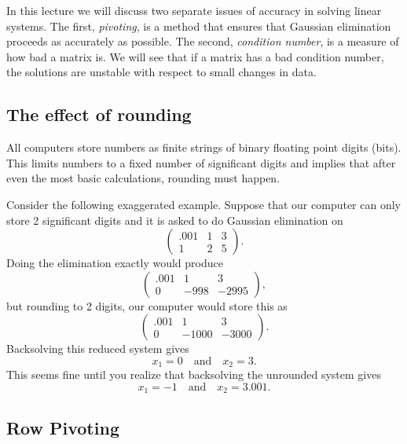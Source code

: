 In this lecture we will discuss two separate issues
of accuracy in solving linear systems. The first,
{\em pivoting}, is a method that ensures that Gaussian
elimination proceeds as accurately as possible.
The second, {\em condition number}, is a measure
of how bad a matrix is. We will see that if a matrix has
a bad condition number, the solutions are unstable with
respect to small changes in data.


\subsection*{The effect of rounding}

All computers store numbers as  finite strings of binary
floating point digits (bits). This limits numbers to a fixed
number of significant digits and implies that after even
the most basic calculations, rounding must happen.

Consider the following exaggerated example. Suppose
that our computer can only store 2 significant digits
and it is asked to do Gaussian elimination on
\begin{equation*}
\left(\begin{array}{cc|c}
        .001 & 1 & 3  \\
          1 &  2 & 5
      \end{array}\right).
\end{equation*}
Doing the elimination exactly would produce
\begin{equation*}
\left(\begin{array}{cc|c}
        .001 & 1 & 3  \\
          0 & -998 & -2995
      \end{array}\right),
\end{equation*}
but rounding to 2 digits, our computer would store this as
\begin{equation*}
\left(\begin{array}{cc|c}
        .001 & 1 & 3  \\
          0 &  -1000 & -3000
      \end{array}\right).
\end{equation*}
Backsolving this reduced system gives
$$
     x_1 = 0 \quad\text{and}\quad x_2 = 3.
$$
This seems fine until you realize that backsolving the unrounded
system gives
$$
    x_1 = -1 \quad\text{and}\quad x_2 = 3.001.
$$


\subsection*{Row Pivoting}


